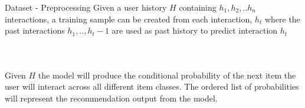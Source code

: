 \documentclass{beamer}
\begin{document}
\begin{frame}{Dataset - Preprocessing}
Given a user history $H$ containing $h_1, h_2, .. h_n$ interactions, a training sample can be created from each interaction, $h_t$ where the past interactions $h_1, .., h_t-1$ are used as past history to predict interaction $h_t$

\begin{columns}[c] %

\begin{figure}%
    \centering
\end{figure}

\begin{figure}%
    \centering
\end{figure}
\end{columns}
Given $H$ the model will produce the conditional probability of the next item the user will interact across all different item classes. The ordered list of probabilities will represent the recommendation output from the model.

\end{frame}
\end{document}
